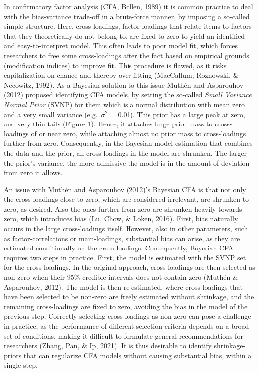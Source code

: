 \documentclass[
  man, donotrepeattitle,floatsintext]{apa6}
\begin{document}
In confirmatory factor analysis (CFA, Bollen, 1989) it is common practice to deal with the bias-variance trade-off in a brute-force manner, by imposing a so-called simple structure. Here, cross-loadings, factor loadings that relate items to factors that they
theoretically do not belong to, are fixed to zero to yield an identified and easy-to-interpret model. This often leads to poor model fit, which forces researchers to free some cross-loadings after the fact based on empirical grounds (modification indices) to improve fit. This procedure is flawed, as it risks capitalization on chance and thereby over-fitting (MacCallum, Roznowski, \& Necowitz, 1992). As a Bayesian solution to this issue Muthén and Asparouhov (2012) proposed identifying CFA models, by setting the so-called \emph{Small Variance Normal Prior} (SVNP) for them which is a normal distribution with mean zero and a very small variance (e.g.~\(\sigma^2\) = 0.01). This prior has a large peak at zero, and very thin tails (Figure 1). Hence, it attaches large prior mass to cross-loadings of or near zero, while attaching almost no prior mass to cross-loadings further from zero. Consequently, in the Bayesian model estimation that combines the data and the prior, all cross-loadings in the model are shrunken. The larger the prior's variance, the more admissive the model is in the amount of deviation from zero it allows.

An issue with Muthén and Asparouhov (2012)'s Bayesian CFA is that not only the cross-loadings close to zero, which are considered irrelevant, are shrunken to zero, as desired. Also the ones further from zero are shrunken heavily towards zero, which introduces bias (Lu, Chow, \& Loken, 2016). First, bias naturally occurs in the large cross-loadings itself. However, also in other parameters, such as factor-correlations or main-loadings, substantial bias can arise, as they are estimated conditionally on the cross-loadings. Consequently, Bayesian CFA requires two steps in practice. First, the model is estimated with the SVNP set for the cross-loadings. In the original approach, cross-loadings are then selected as non-zero when their 95\% credible intervals does not contain zero (Muthén \& Asparouhov, 2012). The model is then re-estimated, where cross-loadings that have been selected to be non-zero are freely estimated without shrinkage, and the remaining cross-loadings are fixed to zero, avoiding the bias in the model of the previous step. Correctly selecting cross-loadings as non-zero can pose a challenge in practice, as the performance of different selection criteria depends on a broad set of conditions, making it difficult to formulate general recommendations for researchers (Zhang, Pan, \& Ip, 2021). It is thus desirable to identify shrinkage-priors that can regularize CFA models without causing substantial bias, within a single step.
\end{document}
